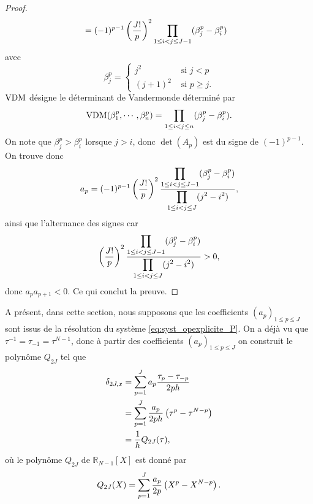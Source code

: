 \begin{proof}
\begin{align*}
	& = (-1)^{p-1} \left( \dfrac{J!}{p} \right)^2 \displaystyle\prod\limits_{1 \leq i <j \leq J-1}(\beta_j^p - \beta_i^p)
\end{align*}
avec
\begin{equation}
\beta_j^p = \left\lbrace
\begin{array}{cl}
j^2 & \text{ si } j < p \\
(j+1)^2 & \text{ si } p \geq j.
\end{array}
\right.
\end{equation}
$\text{VDM}$ désigne le déterminant de Vandermonde \cite{Evans1976} déterminé par 
\begin{equation}
\text{VDM}(\beta_1^p, \cdots, \beta_n^p) = \displaystyle\prod\limits_{1\leq i < j \leq n} (\beta_j^p - \beta_i^p).
\end{equation}
On note que $\beta_j^p > \beta_i^p$ lorsque $j>i$, donc $\det (A_p)$ est du signe de $(-1)^{p-1}$.
On trouve donc 
\begin{equation}
a_p = (-1)^{p-1} \left( \dfrac{J!}{p} \right)^2 \dfrac{\displaystyle\prod\limits_{1 \leq i <j \leq J-1}(\beta_j^p - \beta_i^p)}{\displaystyle\prod\limits_{1 \leq i <j \leq J}(j^2 - i^2)},
\end{equation}
ainsi que l'alternance des signes car
\begin{equation}
\left( \dfrac{J!}{p} \right)^2 \dfrac{\displaystyle\prod\limits_{1 \leq i <j \leq J-1}(\beta_j^p - \beta_i^p)}{\displaystyle\prod\limits_{1 \leq i <j \leq J}(j^2 - i^2)} > 0,
\end{equation}
donc $a_p a_{p+1} < 0$. Ce qui conclut la preuve.
\end{proof}
A présent, dans cette section, nous supposons que les coefficients $(a_p)_{1 \leq p \leq J}$ sont issus de la résolution du système \eqref{eq:syst_opexplicite_P}. On a déjà vu que $\tau^{-1} = \tau_{-1} = \tau^{N-1}$, donc à partir des coefficients $(a_p)_{1 \leq p \leq J}$ on construit le polynôme $Q_{2J}$ tel que
\begin{align*}
\delta_{2J,x} & = \displaystyle\sum\limits_{p=1}^J a_p \dfrac{\tau_p - \tau_{-p}}{2ph}\\
	& = \displaystyle\sum\limits_{p=1}^J \dfrac{a_p}{2ph} \left( \tau^p - \tau^{N-p} \right)\\
	& = \dfrac{1}{h} Q_{2J}(\tau),
\end{align*}
où le polynôme $Q_{2J}$ de $\mathbb{R}_{N-1}[X]$ est donné par
\begin{equation}
Q_{2J}(X) = \displaystyle\sum\limits_{p=1}^J \dfrac{a_p}{2p} \left( X^p - X^{N-p} \right).
\end{equation}


